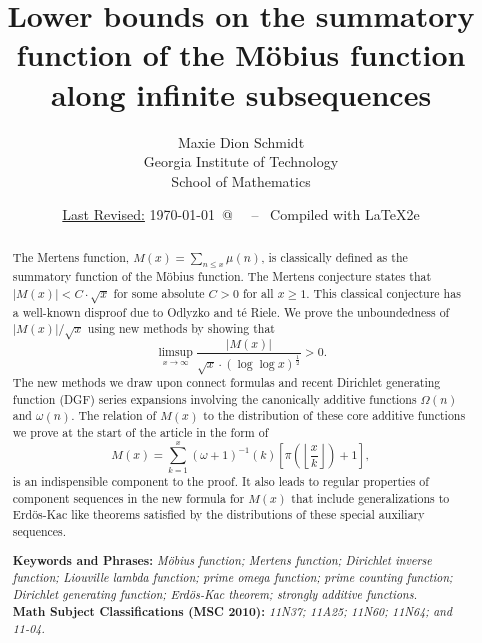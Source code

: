 \documentclass[11pt,reqno,a4letter]{article}
\title{
       \LARGE{
       Lower bounds on the summatory function of the M\"obius function along infinite subsequences 
       } 
}
\author{{\Large Maxie Dion Schmidt} \\ 
        {\normalsize Georgia Institute of Technology} \\[0.025cm] 
        {\normalsize School of Mathematics} 
}
\date{\small\underline{Last Revised:} \today \ @\ \hhmmsstime{} \ -- \ Compiled with \LaTeX2e}
\numberwithin{figure}{section}
\numberwithin{table}{section}
\theoremstyle{plain}
\numberwithin{theorem}{section}
\theoremstyle{definition}
\begin{document}
 

\maketitle

\begin{abstract} 
The Mertens function, $M(x) = \sum_{n \leq x} \mu(n)$, is classically 
defined as the summatory function of the M\"obius function. 
The Mertens conjecture states that $|M(x)| < C \cdot \sqrt{x}$ for some absolute $C > 0$ for all 
$x \geq 1$. 
This classical conjecture has a well-known disproof due to 
Odlyzko and t\'{e} Riele. 
We prove the unboundedness of $|M(x)| / \sqrt{x}$ using new methods by showing that 
$$\limsup_{x \rightarrow \infty} \frac{|M(x)|}{\sqrt{x} \cdot (\log\log x)^{\frac{1}{2}}} > 0.$$ 
The new methods we draw upon connect formulas and recent 
Dirichlet generating function (DGF) series expansions involving the canonically 
additive functions $\Omega(n)$ and $\omega(n)$. 
The relation of $M(x)$ to the distribution of these core additive functions 
we prove at the start of the article in the form of 
\[
M(x) = \sum_{k=1}^{x} (\omega + 1)^{-1}(k) \left[\pi\left(\left\lfloor \frac{x}{k} \right\rfloor\right) + 1\right],
\]
is an indispensible component to the proof. 
It also leads to regular properties of component sequences in the new formula for $M(x)$ that include 
generalizations to Erd\"os-Kac like theorems satisfied by the distributions of these special auxiliary 
sequences. 

\bigskip 
\noindent
\textbf{Keywords and Phrases:} {\it M\"obius function; Mertens function; 
                                    Dirichlet inverse function; Liouville lambda function; prime omega function; 
                                    prime counting function; Dirichlet generating function; 
                                    Erd\"os-Kac theorem; strongly additive functions. } \\ 
\textbf{Math Subject Classifications (MSC 2010):} {\it 11N37; 11A25; 11N60; 11N64; and 11-04. } 
\end{abstract} 
\end{document}
